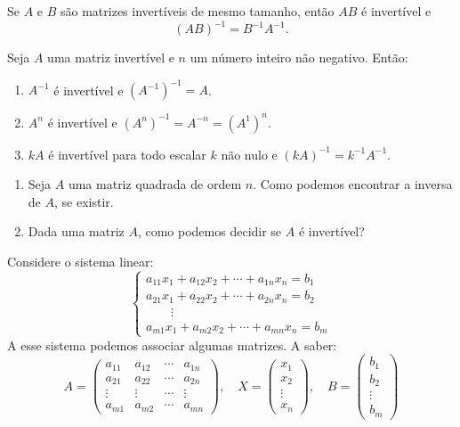 \begin{proposicao}
    Se $A$ e $B$ são matrizes invertíveis de mesmo tamanho, então $AB$ é invertível e
    \[
        (AB)^{-1} = B^{-1} A^{-1}.
    \]
\end{proposicao}

\begin{proposicao}
    Seja $A$ uma matriz invertível e $n$ um número inteiro não negativo. Então:
    \begin{enumerate}[label={\roman*})]
        \item $A^{-1}$ é invertível e $(A^{-1})^{-1} = A$.

        \item $A^n$ é invertível e $(A^n)^{-1} = A^{-n} = (A^{1})^n$.

        \item $kA$ é invertível para todo escalar $k$ não nulo e $(kA)^{-1} = k^{-1}A^{-1}$.
    \end{enumerate}
\end{proposicao}

\begin{enumerate}[label={\arabic*})]
    \item Seja $A$ uma matriz quadrada de ordem $n$. Como podemos encontrar a inversa de $A$, se existir.

    \item Dada uma matriz $A$, como podemos decidir se $A$ é invertível?
\end{enumerate}

Considere o sistema linear: 
\begin{equation}
\begin{cases}
        a_{11}x_1 + a_{12}x_2 + \cdots + a_{1n}x_n = b_1\\
        a_{21}x_1 + a_{22}x_2 + \cdots + a_{2n}x_n = b_2\\
        \qquad \vdots\\
        a_{m1}x_1 + a_{m2}x_2 + \cdots + a_{mn}x_n = b_m
    \end{cases}
\end{equation}
A esse sistema podemos associar algumas matrizes. A saber:
\[
    A = \begin{pmatrix}
        a_{11} & a_{12} & \cdots & a_{1n}\\
        a_{21} & a_{22} & \cdots & a_{2n}\\
        \vdots & \vdots & \cdots & \vdots\\
        a_{m1} & a_{m2} & \cdots & a_{mn}
    \end{pmatrix}, \quad
    X = \begin{pmatrix}
        x_1\\
        x_2\\
        \vdots\\
        x_n
    \end{pmatrix},\quad 
    B = \begin{pmatrix}
        b_1\\
        b_2\\
        \vdots\\
        b_m
    \end{pmatrix}
\]

